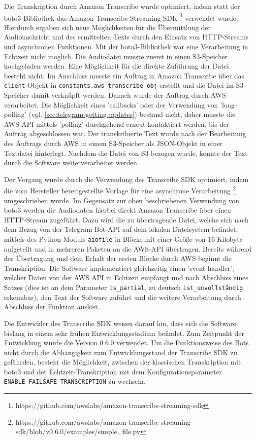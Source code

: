Die Transkription durch Amazon Transcribe wurde optimiert, indem statt der boto3-Bibliothek das Amazon Transcribe Streaming SDK \footnote{https://github.com/awslabs/amazon-transcribe-streaming-sdk} verwendet wurde. Hierdurch ergaben sich neue Möglichkeiten für die Übermittlung der Audionachricht und des ermittelten Texts durch den Einsatz von HTTP-Streams und asynchronen Funktionen. Mit der boto3-Bibliothek war eine Verarbeitung in Echtzeit nicht möglich. Die Audiodatei musste zuerst in einen S3-Speicher hochgeladen werden. Eine Möglichkeit für die direkte Zuführung der Datei besteht nicht. Im Anschluss musste ein Auftrag in Amazon Transcribe über das \lstinline{client}-Objekt in \lstinline{constants.aws_transcribe_obj} erstellt und die Datei im S3-Speicher damit verknüpft werden. Danach wurde der Auftrag durch AWS verarbeitet. Die Möglichkeit eines 'callbacks' oder der Verwendung von 'long-polling' (vgl. \autoref{sec:telegram-getting-updates}) bestand nicht, daher musste die AWS-API mittels 'polling' durchgehend erneut kontaktiert werden, bis der Auftrag abgeschlossen war. Der transkribierte Text wurde nach der Bearbeitung des Auftrags durch AWS in einem S3-Speicher als JSON-Objekt in einer Textdatei hinterlegt. Nachdem die Datei von S3 bezogen wurde, konnte der Text durch die Software weiterverarbeitet werden.

Der Vorgang wurde durch die Verwendung des Transcribe SDK optimiert, indem die vom Hersteller bereitgestellte Vorlage für eine asynchrone Verarbeitung \footnote{https://github.com/awslabs/amazon-transcribe-streaming-sdk/blob/v0.6.0/examples/simple\_file.py} umgeschrieben wurde. Im Gegensatz zur oben beschriebenen Verwendung von boto3 werden die Audiodaten hierbei direkt Amazon Transcribe über einen HTTP-Stream zugeführt. Dazu wird die zu übertragende Datei, welche sich nach dem Bezug von der Telegram Bot-API auf dem lokalen Dateisystem befindet, mittels des Python Moduls \lstinline{aiofile} in Blöcke mit einer Größe von 16 Kilobyte aufgeteilt und in mehreren Paketen an die AWS-API übertragen. Bereits während der Übertragung und dem Erhalt der ersten Blöcke durch AWS beginnt die Transkription. Die Software implementiert gleichzeitig einen 'event handler', welcher Daten von der AWS API in Echtzeit empfängt und nach Abschluss eines Satzes (dies ist an dem Parameter \lstinline{is_partial}, zu deutsch \lstinline{ist_unvollständig} erkennbar), den Text der Software zuführt und die weitere Verarbeitung durch Abschluss der Funktion auslöst.

Die Entwickler des Transcribe SDK weisen darauf hin, dass sich die Software bislang in einem sehr frühen Entwicklungsstadium befindet. Zum Zeitpunkt der Entwicklung wurde die Version 0.6.0 verwendet. Um die Funktionsweise des Bots nicht durch die Abhängigkeit zum Entwicklungsstand der Transcribe SDK zu gefährden, besteht die Möglichkeit, zwischen der klassischen Transkription mit boto3 und der Echtzeit-Transkription mit dem Konfigurationsparameter \lstinline{ENABLE_FAILSAFE_TRANSCRIPTION} zu wechseln.

